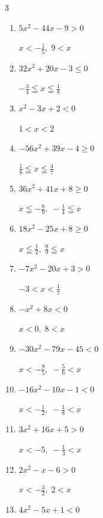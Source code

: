 \begin{multicols}{3}
\begin{enumerate}
  \item $5x^{2}-44x-9>0$

        $\displaystyle x < -\frac{1}{5} , \; 9 < x$

  \item $32x^{2}+20x-3\leq 0$

        $\displaystyle -\frac{3}{4} \leqq x \leqq \frac{1}{8}$

  \item $x^{2}-3x+2<0$

        $\displaystyle 1 < x < 2$

  \item $-56x^{2}+39x-4\geq 0$

        $\displaystyle \frac{1}{8} \leqq x \leqq \frac{4}{7}$

  \item $36x^{2}+41x+8\geq 0$

        $\displaystyle x \leqq -\frac{8}{9} , \; -\frac{1}{4} \leqq x$

  \item $18x^{2}-25x+8\geq 0$

        $\displaystyle x \leqq \frac{1}{2} , \; \frac{8}{9} \leqq x$

  \item $-7x^{2}-20x+3>0$

        $\displaystyle -3 < x < \frac{1}{7}$

  \item $-x^{2}+8x<0$

        $\displaystyle x < 0 , \; 8 < x$

\columnbreak %

\resetques

  \item $-30x^{2}-79x-45<0$

        $\displaystyle x < -\frac{9}{5} , \; -\frac{5}{6} < x$

  \item $-16x^{2}-10x-1<0$

        $\displaystyle x < -\frac{1}{2} , \; -\frac{1}{8} < x$

  \item $3x^{2}+16x+5>0$

        $\displaystyle x < -5 , \; -\frac{1}{3} < x$

  \item $2x^{2}-x-6>0$

        $\displaystyle x < -\frac{3}{2} , \; 2 < x$

  \item $4x^{2}-5x+1<0$


\end{enumerate}
\end{multicols}
